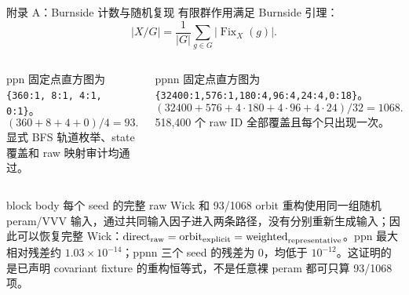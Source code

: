\documentclass[aspectratio=169,UTF8,fontset=fandol]{ctexbeamer}
\begin{document}
\begin{frame}{附录 A：Burnside 计数与随机复现}
\small
有限群作用满足 Burnside 引理：
\[
 |X/G|=\frac{1}{|G|}\sum_{g\in G}|\operatorname{Fix}_X(g)| .
\]
\begin{columns}[T,onlytextwidth]
\begin{block}{ppn}
\scriptsize
固定点直方图为
\texttt{\{360:1, 8:1, 4:1, 0:1\}}。\[
 (360+8+4+0)/4=93 .
\]
显式 BFS 轨道枚举、state 覆盖和 raw 映射审计均通过。
\end{block}
\begin{block}{ppnn}
\scriptsize
固定点直方图为
\texttt{\{32400:1,576:1,180:4,96:4,24:4,0:18\}}。\[
 (32400+576+4\cdot180+4\cdot96+4\cdot24)/32=1068 .
\]
518,400 个 raw ID 全部覆盖且每个只出现一次。
\end{block}
\end{columns}
\vspace{0.2em}
\begin{beamercolorbox}[sep=0.4em,wd=\linewidth]{block body}
\scriptsize
每个 seed 的完整 raw Wick 和 93/1068 orbit 重构使用同一组随机 peram/VVV 输入，通过共同输入因子进入两条路径，没有分别重新生成输入；因此可以恢复完整 Wick：\(\text{direct}_{\rm raw}=\text{orbit}_{\rm explicit}=\text{weighted}_{\rm representative}\)。ppn 最大相对残差约 \(1.03\times10^{-14}\)；ppnn 三个 seed 的残差为 0，均低于 \(10^{-12}\)。这证明的是已声明 covariant fixture 的重构恒等式，不是任意裸 peram 都可只算 93/1068 项。
\end{beamercolorbox}
\end{frame}
\end{document}
